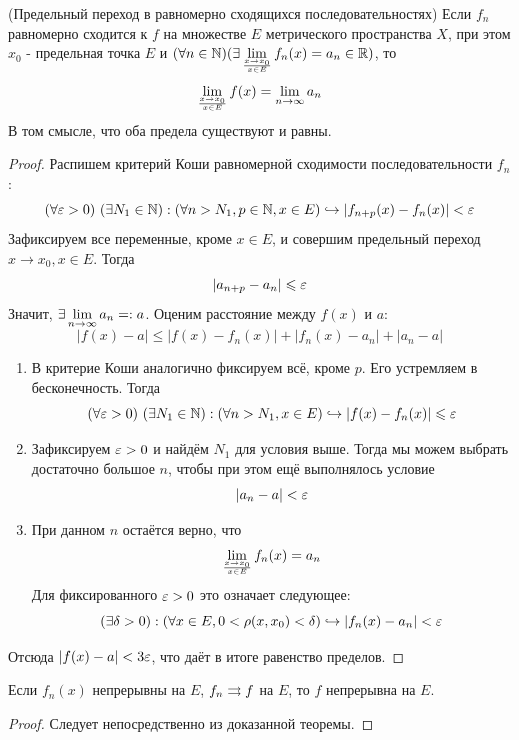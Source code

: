 \begin{theorem} (Предельный переход в равномерно сходящихся последовательностях)
	Если $f_n$ равномерно сходится к $f$ на множестве $E$ метрического пространства $X$, при этом $x_0$ - предельная точка $E$ и $(\forall n \in \mathbb{N})(\exists \lim\limits_{x \to x_0 \over x \in E} f_n(x) = a_n\in\mathbb{R})$, то
	\[
		\lim\limits_{x \to x_0 \over x \in E} f(x) = \lim\limits_{n \to \infty} a_n
	\]
	В том смысле, что оба предела существуют и равны.
\end{theorem}

\begin{proof}
	Распишем критерий Коши равномерной сходимости последовательности $f_n$:
	\[
		(\forall \varepsilon > 0)\ (\exists N_1 \in \mathbb{N}) : (\forall n > N_1, p \in \mathbb{N}, x \in E) \hookrightarrow |f_{n + p}(x) - f_n(x)| < \varepsilon
	\]
	Зафиксируем все переменные, кроме $x \in E$, и совершим предельный переход $x \to x_0, x \in E$. Тогда
	\[
		|a_{n + p} - a_n| \leqslant \varepsilon
	\]
	Значит, $\exists \lim\limits_{n \to \infty} a_n =: a$. Оценим расстояние между $f(x)$ и $a$:
	\[
		|f(x) - a| \le |f(x) - f_n(x)| + |f_n(x) - a_n| + |a_n - a|
	\]
	\begin{enumerate}
		\item В критерие Коши аналогично фиксируем всё, кроме $p$. Его устремляем в бесконечность. Тогда
		\[
			(\forall \varepsilon > 0)\ (\exists N_1 \in \mathbb{N}) : (\forall n > N_1, x \in E) \hookrightarrow |f(x) - f_n(x)| \leqslant \varepsilon
		\]
		
		\item Зафиксируем $\varepsilon > 0$ и найдём $N_1$ для условия выше. Тогда мы можем выбрать достаточно большое $n$, чтобы при этом ещё выполнялось условие
		\[
			|a_n - a| < \varepsilon
		\]
		
		\item При данном $n$ остаётся верно, что
		\[
			\lim\limits_{x \to x_0 \over x \in E} f_n(x) = a_n
		\]
		Для фиксированного $\varepsilon > 0$ это означает следующее:
		\[
			(\exists \delta > 0) : (\forall x \in E, 0 < \rho(x, x_0) < \delta) \hookrightarrow |f_n(x) - a_n| < \varepsilon
		\]
	\end{enumerate}
	Отсюда $|f(x) - a| < 3\varepsilon$, что даёт в итоге равенство пределов.
\end{proof}

\begin{corollary}
	Если $f_n(x)$ непрерывны на $E$, $f_n \rightrightarrows f$ на $E$, то $f$ непрерывна на $E$.
\end{corollary}

\begin{proof}
	Следует непосредственно из доказанной теоремы.
\end{proof}

